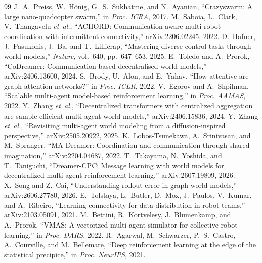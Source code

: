 \documentclass[conference]{IEEEtran}
\begin{document}
{
\begin{thebibliography}{99}
 J.~A.~Preiss, W.~H\"onig, G.~S.~Sukhatme, and N.~Ayanian, ``Crazyswarm: A large nano-quadcopter swarm,'' in \emph{Proc. ICRA}, 2017.
 M.~Saboia, L.~Clark, V.~Thangavelu \emph{et~al.}, ``ACHORD: Communication-aware multi-robot coordination with intermittent connectivity,'' arXiv:2206.02245, 2022.
 D.~Hafner, J.~Pasukonis, J.~Ba, and T.~Lillicrap, ``Mastering diverse control tasks through world models,'' \emph{Nature}, vol.~640, pp.~647--653, 2025.
 E.~Toledo and A.~Prorok, ``CoDreamer: Communication-based decentralised world models,'' arXiv:2406.13600, 2024.
 S.~Brody, U.~Alon, and E.~Yahav, ``How attentive are graph attention networks?'' in \emph{Proc. ICLR}, 2022.
 V.~Egorov and A.~Shpilman, ``Scalable multi-agent model-based reinforcement learning,'' in \emph{Proc. AAMAS}, 2022.
 Y.~Zhang \emph{et~al.}, ``Decentralized transformers with centralized aggregation are sample-efficient multi-agent world models,'' arXiv:2406.15836, 2024.
 Y.~Zhang \emph{et~al.}, ``Revisiting multi-agent world modeling from a diffusion-inspired perspective,'' arXiv:2505.20922, 2025.
 K.~Lobos-Tsunekawa, A.~Srinivasan, and M.~Spranger, ``MA-Dreamer: Coordination and communication through shared imagination,'' arXiv:2204.04687, 2022.
 T.~Takayama, N.~Yoshida, and T.~Taniguchi, ``Dreamer-CPC: Message learning with world models for decentralized multi-agent reinforcement learning,'' arXiv:2607.19809, 2026.
 X.~Song and Z.~Cai, ``Understanding rollout error in graph world models,'' arXiv:2606.27780, 2026.
 E.~Tolstaya, L.~Butler, D.~Mox, J.~Paulos, V.~Kumar, and A.~Ribeiro, ``Learning connectivity for data distribution in robot teams,'' arXiv:2103.05091, 2021.
 M.~Bettini, R.~Kortvelesy, J.~Blumenkamp, and A.~Prorok, ``VMAS: A vectorized multi-agent simulator for collective robot learning,'' in \emph{Proc. DARS}, 2022.
 R.~Agarwal, M.~Schwarzer, P.~S.~Castro, A.~Courville, and M.~Bellemare, ``Deep reinforcement learning at the edge of the statistical precipice,'' in \emph{Proc. NeurIPS}, 2021.
\end{thebibliography}}
\end{document}
